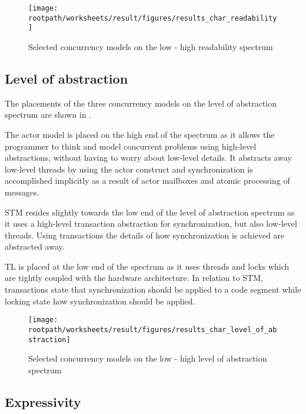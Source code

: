 \begin{figure}[htbp]
\centering
 \texttt{[image: \\rootpath/worksheets/result/figures/results\_char\_readability]} 
 \caption{Selected concurrency models on the low - high readability spectrum}
\label{fig:results_char_readability}
\end{figure}

\subsection{Level of abstraction}
The placements of the three concurrency models on the level of abstraction spectrum are shown in .

The actor model is placed on the high end of the spectrum as it allows the programmer to think and model concurrent problems using high-level abstractions, without having to worry about low-level details. It abstracts away low-level threads by using the actor construct and synchronization is accomplished implicitly as a result of actor mailboxes and atomic processing of messages.

\ac{STM} resides slightly towards the low end of the level of abstraction spectrum as it uses a high-level transaction abstraction for synchronization, but also low-level threads. Using transactions the details of how synchronization is achieved are abstracted away. 

\ac{TL} is placed at the low end of the spectrum as it uses threads and locks which are tightly coupled with the hardware architecture. In relation to \ac{STM}, transactions state that synchronization should be applied to a code segment while locking state how synchronization should be applied.

\begin{figure}[htbp]
\centering
 \texttt{[image: \\rootpath/worksheets/result/figures/results\_char\_level\_of\_abstraction]} 
 \caption{Selected concurrency models on the low - high level of abstraction spectrum}
\label{fig:results_char_level_of_abstraction}
\end{figure}

\subsection{Expressivity}

